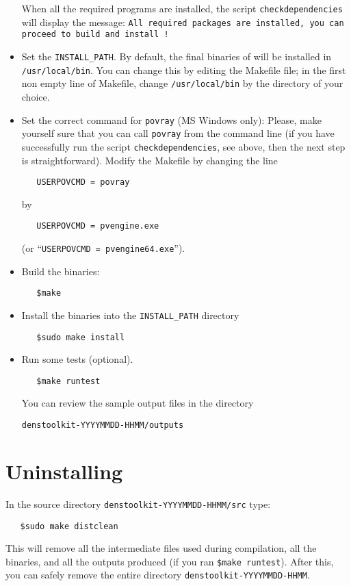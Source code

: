 \begin{itemize}
When all the required programs are installed, the script \texttt{checkdependencies} will display the message: \texttt{All required packages are installed, you can proceed to build and install \DTK!}
\item Set the \texttt{INSTALL\_PATH}. By default, the final binaries of \DTK{} will be installed in \texttt{/usr/local/bin}. You can change this by editing the Makefile file; in the first non empty line of Makefile, change \texttt{/usr/local/bin} by the directory of your choice.
\item Set the correct command for \texttt{povray} (MS Windows only): Please, make yourself sure that you can call \texttt{povray} from the command line (if you have successfully run the script \texttt{checkdependencies}, see above, then the next step is straightforward). Modify the Makefile by changing the line
\begin{verbatim}
   USERPOVCMD = povray
\end{verbatim}
by
\begin{verbatim}
   USERPOVCMD = pvengine.exe
\end{verbatim}
(or ``\texttt{USERPOVCMD = pvengine64.exe}'').
\item Build the \DTK{} binaries:
\begin{verbatim}
   $make
\end{verbatim}
\item Install the binaries into the \texttt{INSTALL\_PATH} directory
\begin{verbatim}
   $sudo make install
\end{verbatim}
\item Run some tests (optional).
\begin{verbatim}
   $make runtest
\end{verbatim}
 You can review the sample output files in the directory 
 
 \texttt{denstoolkit-YYYYMMDD-HHMM/outputs}
\end{itemize}

\section{Uninstalling \DTK}

In the source directory \texttt{denstoolkit-YYYYMMDD-HHMM/src} type:
\begin{verbatim}
   $sudo make distclean
\end{verbatim}
This will remove all the intermediate files used during compilation, all the binaries, and all the outputs produced (if you ran \texttt{\$make runtest}). After this, you can safely remove the entire directory \texttt{denstoolkit-YYYYMMDD-HHMM}.








